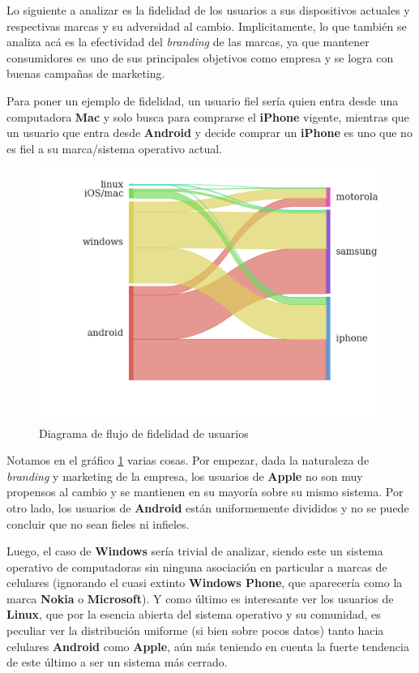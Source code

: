 \documentclass[a4paper]{article}
\begin{document}
Lo siguiente a analizar es la fidelidad de los usuarios a sus dispositivos actuales y respectivas marcas y su adversidad al cambio. Implicitamente, lo que también se analiza acá es la efectividad del \textit{branding} de las marcas, ya que mantener consumidores es uno de sus principales objetivos como empresa y se logra con buenas campañas de marketing.

Para poner un ejemplo de fidelidad, un usuario fiel sería quien entra desde una computadora \textbf{Mac} y solo busca para comprarse el \textbf{iPhone} vigente, mientras que un usuario que entra desde \textbf{Android} y decide comprar un \textbf{iPhone} es uno que no es fiel a su marca/sistema operativo actual.

\begin{figure}[h!]
	\includegraphics[width=\linewidth]{figures/151-os_brands-sankey.png}
	\caption{Diagrama de flujo de fidelidad de usuarios}
	\label{fig:sankey}
\end{figure}

Notamos en el gráfico \ref{fig:sankey} varias cosas. Por empezar, dada la naturaleza de \textit{branding} y marketing de la empresa, los usuarios de \textbf{Apple} no son muy propensos al cambio y se mantienen en su mayoría sobre su mismo sistema. Por otro lado, los usuarios de \textbf{Android} están uniformemente divididos y no se puede concluir que no sean fieles ni infieles. 

Luego, el caso de \textbf{Windows} sería trivial de analizar, siendo este un sistema operativo de computadoras sin ninguna asociación en particular a marcas de celulares (ignorando el cuasi extinto \textbf{Windows Phone}, que aparecería como la marca \textbf{Nokia} o \textbf{Microsoft}). Y como último es interesante ver los usuarios de \textbf{Linux}, que por la esencia abierta del sistema operativo y su comunidad, es peculiar ver la distribución uniforme (si bien sobre pocos datos) tanto hacia celulares \textbf{Android} como \textbf{Apple}, aún más teniendo en cuenta la fuerte tendencia de este último a ser un sistema más cerrado.
\end{document}
